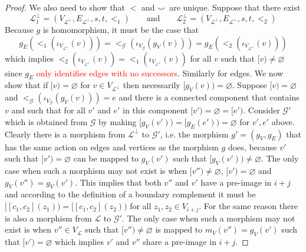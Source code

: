 \begin{proof}
    We also need to show that $<$ and ${\smile}$ are unique.
    Suppose that there exist
    \[
        \mathcal{L}^{\bot}_{1} = (V_{\mathcal{L}^{\bot}}, E_{\mathcal{L}^{\bot}}, s,t, <_{1})
    \qquad
    \text{and}
    \qquad
        \mathcal{L}^{\bot}_{2} = (V_{\mathcal{L}^{\bot}},E_{\mathcal{L}^{\bot}},s,t, <_{2})
    \]
    Because $g$ is homomorphism, it must be the case that 
    \[
        g_{E}(<_{1}(\iota_{V_{\mathcal{L}^{\bot}}}(v))) = <_{\mathcal{G}}(\iota_{V_{\mathcal{G}}}(g_{V}(v))) = g_{E}(<_{2}(\iota_{V_{\mathcal{L}^{\bot}}}(v)))
    \]
    which implies $<_{2}(\iota_{V_{\mathcal{L}^{\bot}}}(v)) = <_{1}(\iota_{V_{\mathcal{L}^{\bot}}}(v))$ for all $v$ such that $[v) \not = \varnothing$ since $g_{E}$ \textcolor{red}{only identifies edges with no successors}.
    Similarly for edges.
    We now show that if $[v) = \varnothing$ for $v \in V_{\mathcal{L}^{\bot}}$ then necessarily $[g_{V}(v)) = \varnothing$.
    Suppose $[v) = \varnothing$ and $<_{\mathcal{G}}(\iota_{V_{\mathcal{G}}}(g_{V}(v))) = e$ and there is a connected component that contains $v$ and such that for all $v'$ and $e'$ in this component $[v') = \varnothing = [e')$.
    Consider $\mathcal{G'}$ which is obtained from $\mathcal{G}$ by making $[g_{V}(v')) = [g_{E}(e')) = \varnothing$ for $v', e'$ above.
    Clearly there is a morphism from $\mathcal{L}^{\bot}$ to $\mathcal{G}'$, i.e. the morphism $g' = (g_{V},g_{E})$ that has the same action on edges and vertices as the morphism $g$ does, because $v'$ such that $[v') = \varnothing$ can be mapped to $g_{V}(v')$ such that $[g_{V}(v')) \not = \varnothing$.
    The only case when such a morphism may not exist is when $[v'') \not = \varnothing$, $[v') = \varnothing$ and $g_{V}(v'') = g_{V}(v')$.
    This implies that both $v''$ and $v'$ have a pre-image in $i + j$ and according to the definition of a boundary complement it must be $[[c_1,c_2](z_1)) = [[c_1,c_2](z_2))$ for all $z_1, z_2 \in V_{i + j}$.
    For the same reason there is also a morphism from $\mathcal{L}$ to $\mathcal{G}'$.
    The only case when such a morphism may not exist is when $v'' \in V_{\mathcal{L}}$ such that $[v'') \not = \varnothing$ is mapped to $m_{V}(v'') = g_{V}(v')$ such that $[v') = \varnothing$ which implies $v'$ and $v''$ share a pre-image in $i + j$.

\end{proof}
